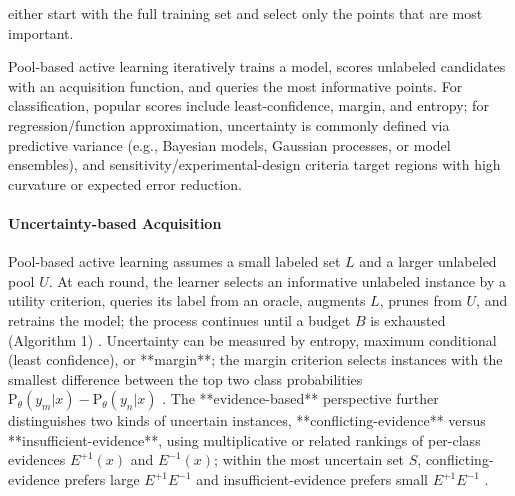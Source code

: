 \documentclass[conference]{IEEEtran}
\begin{document}
either start with the full training set and select only the points that are most important.  

Pool-based active learning iteratively trains a model, scores unlabeled candidates with an acquisition function, and queries the most informative points. For classification, popular scores include least-confidence, margin, and entropy; for regression/function approximation, uncertainty is commonly defined via predictive variance (e.g., Bayesian models, Gaussian processes, or model ensembles), and sensitivity/experimental-design criteria target regions with high curvature or expected error reduction. 
\paragraph*{Uncertainty-based Acquisition}
Pool-based active learning assumes a small labeled set $L$ and a larger unlabeled pool $U$. At each round, the learner selects an informative unlabeled instance by a utility criterion, queries its label from an oracle, augments $L$, prunes from $U$, and retrains the model; the process continues until a budget $B$ is exhausted (Algorithm 1)  . Uncertainty can be measured by entropy, maximum conditional (least confidence), or **margin**; the margin criterion selects instances with the smallest difference between the top two class probabilities $\mathrm{P}_\theta(y_m|x)-\mathrm{P}_\theta(y_n|x)$  . The **evidence-based** perspective further distinguishes two kinds of uncertain instances, **conflicting-evidence** versus **insufficient-evidence**, using multiplicative or related rankings of per-class evidences $E^{+1}(x)$ and $E^{-1}(x)$; within the most uncertain set $S$, conflicting-evidence prefers large $E^{+1}E^{-1}$ and insufficient-evidence prefers small $E^{+1}E^{-1}$  .
\end{document}

